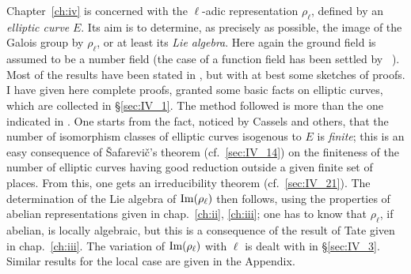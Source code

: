 Chapter~\ref{ch:iv} is concerned with the $\ell$-adic representation
$\rho_\ell$, defined by an \emph{elliptic curve} $E$. Its aim is to determine,
as precisely as possible, the image of the Galois group by $\rho_\ell$, or at
least its \emph{Lie algebra}. Here again the ground field is assumed to be a
number field (the case of a function field has been settled by
\citeauthor{10}~\cite{10}).  Most of the results have been stated in \cite{25},
\cite{31} but with at best some sketches of proofs. I have given here complete
proofs, granted some basic facts on elliptic curves, which are collected in
\S\ref{sec:IV_1}. The method followed is more  than the one
indicated in \cite{25}. One starts from the fact, noticed by Cassels and
others, that the number of isomorphism classes of elliptic curves isogenous to
$E$ is \emph{finite}; this is an easy consequence of \v Safarevi\v c's theorem
(cf.\ \ref{sec:IV_14}) on the finiteness of the number of elliptic curves
having good reduction outside a given finite set of places. From this, one gets
an irreducibility theorem (cf.\ \ref{sec:IV_21}). The determination of the Lie
algebra of $\operatorname{Im}(\rho_\ell)$ then follows, using the properties of abelian
representations given in chap.~\ref{ch:ii}, \ref{ch:iii}; one has to know that
$\rho_\ell$, if abelian, is locally algebraic, but this is a consequence of the
result of Tate given in chap.~\ref{ch:iii}. The variation of $\operatorname{Im}(\rho_\ell)$
with $\ell$ is dealt with in \S\ref{sec:IV_3}. Similar results for the local
case are given in the Appendix.
